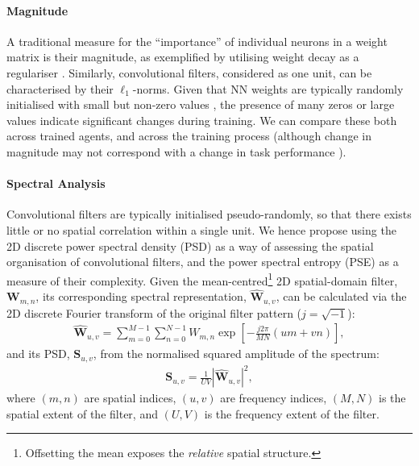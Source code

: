 \label{sec:stat_struct_weight}

\hypertarget{magnitude}{%
\paragraph{Magnitude}\label{magnitude}}

\label{sec:magnitude}

A traditional measure for the ``importance'' of individual neurons in a
weight matrix is their magnitude, as exemplified by utilising weight
decay as a regulariser \cite{hanson1989comparing}. Similarly,
convolutional filters, considered as one unit, can be characterised by
their \(\ell_1\)-norms. Given that NN weights are typically randomly
initialised with small but non-zero values
\cite{glorot2010understanding, lecun1998efficient}, the presence of
many zeros or large values indicate significant changes during training.
We can compare these both across trained agents, and across the training
process (although change in magnitude may not correspond with a change
in task performance \cite{zhang2019all}).

\hypertarget{spectral-analysis}{%
\paragraph{Spectral Analysis}\label{spectral-analysis}}

\label{sec:spectral}

Convolutional filters are typically initialised pseudo-randomly, so that
there exists little or no spatial correlation within a single unit. We
hence propose using the 2D discrete power spectral density (PSD) as a
way of assessing the spatial organisation of convolutional filters, and
the power spectral entropy (PSE) as a measure of their complexity. Given
the mean-centred\footnote{Offsetting the mean exposes the
  \emph{relative} spatial structure.} 2D spatial-domain filter,
\(\mathbf{W}_{m, n}\), its corresponding spectral representation,
\(\mathbf{\hat{W}}_{u, v}\), can be calculated via the 2D discrete
Fourier transform of the original filter pattern (\(j=\sqrt{-1}\)):
\begin{align}
\mathbf{\hat{W}}_{u, v} = \sum_{m=0}^{M-1}\sum_{n=0}^{N-1}W_{m, n} \exp \left [ -\frac{j 2\pi}{MN}(u m + v n) \right ],
\end{align} \noindent and its PSD, \(\mathbf{S}_{u, v}\), from the
normalised squared amplitude of the spectrum: \begin{align}
\mathbf{S}_{u, v} = \frac{1}{U V} \left|\mathbf{\hat{W}}_{u, v}\right|^2,
\end{align} \noindent where \((m, n)\) are spatial indices, \((u, v)\)
are frequency indices, \((M, N)\) is the spatial extent of the filter,
and \((U, V)\) is the frequency extent of the filter.

